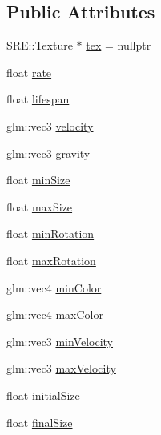 \subsection*{Public Attributes}
\begin{DoxyCompactItemize}
\item 
S\+R\+E\+::\+Texture $\ast$ \hyperlink{struct_mason_1_1_particle_emitter_config_a660e9a7613b158ac36bfc4ffe8b5f610}{tex} = nullptr
\item 
float \hyperlink{struct_mason_1_1_particle_emitter_config_abc0c7231f9134e3b0456d22ee8d5c8a2}{rate}
\item 
float \hyperlink{struct_mason_1_1_particle_emitter_config_a856b3906e25a7d41eb9bc7e37a91ef93}{lifespan}
\item 
glm\+::vec3 \hyperlink{struct_mason_1_1_particle_emitter_config_af8c3efa305e0a0636576bebe60938c80}{velocity}
\item 
glm\+::vec3 \hyperlink{struct_mason_1_1_particle_emitter_config_ad5fa0930e4e3f5d8c9de1324a854e63a}{gravity}
\item 
float \hyperlink{struct_mason_1_1_particle_emitter_config_ab46ccc780e60c6b7006749058654455f}{min\+Size}
\item 
float \hyperlink{struct_mason_1_1_particle_emitter_config_ad8b8933ec9758ed264d1b1ccc3d24bd8}{max\+Size}
\item 
float \hyperlink{struct_mason_1_1_particle_emitter_config_ae6755b96da7af8b4c469b64f0887e186}{min\+Rotation}
\item 
float \hyperlink{struct_mason_1_1_particle_emitter_config_a3a7e271bae699c0998a3d9ac73f3bb6f}{max\+Rotation}
\item 
glm\+::vec4 \hyperlink{struct_mason_1_1_particle_emitter_config_aa70f6e44cc9712bf59ef89e1a339726d}{min\+Color}
\item 
glm\+::vec4 \hyperlink{struct_mason_1_1_particle_emitter_config_af48c8574b50e51408c3566f862e22dbd}{max\+Color}
\item 
glm\+::vec3 \hyperlink{struct_mason_1_1_particle_emitter_config_a3d8df085c0a91b61f42adc5eef888c79}{min\+Velocity}
\item 
glm\+::vec3 \hyperlink{struct_mason_1_1_particle_emitter_config_aa449573ac5e8ae2ef3f5110836a3091c}{max\+Velocity}
\item 
float \hyperlink{struct_mason_1_1_particle_emitter_config_a200875bdd8d24d919160527494c5b611}{initial\+Size}
\item 
float \hyperlink{struct_mason_1_1_particle_emitter_config_a5aabaa7aa8bd203539a56ee269595f94}{final\+Size}

\end{DoxyCompactItemize}
